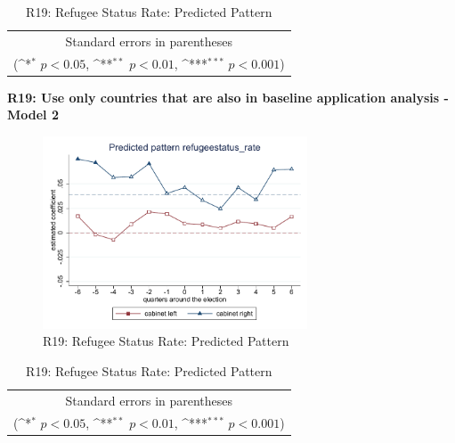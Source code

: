 \documentclass[10pt,a4paper]{scrartcl}
\begin{document}
\begin{table}[!ht]\centering
	\renewcommand{\arraystretch}{1.25}
	\def\sym#1{\ifmmode^{#1}\else\(^{#1}\)\fi}
	\caption{R19: Refugee Status Rate: Predicted Pattern}
	\begin{tabular}{l*{2}{c}}
		\hline\hline
		
		\hline\hline
		\multicolumn{3}{c}{\footnotesize Standard errors in parentheses} \\
		\multicolumn{3}{c}{\footnotesize (\sym{*} \(p<0.05\), \sym{**} \(p<0.01\), \sym{***} \(p<0.001\))}\\
	\end{tabular}
\end{table}

\clearpage
\textbf{R19: Use only countries that are also in baseline application analysis - Model 2}
\begin{figure}[!ht]
	\centering
	\includegraphics[width=0.7\textwidth]{figures_edited/refugeestatus_rate_graph2_R19.pdf}
	\caption{R19: Refugee Status Rate: Predicted Pattern}
\end{figure}

\begin{table}[!ht]\centering
	\footnotesize
	\renewcommand{\arraystretch}{1.2}
	\def\sym#1{\ifmmode^{#1}\else\(^{#1}\)\fi}
	\caption{R19: Refugee Status Rate: Predicted Pattern}
	\begin{tabular}{l*{2}{c}}
		\hline\hline
		
		\hline\hline
		\multicolumn{3}{c}{\footnotesize Standard errors in parentheses} \\
		\multicolumn{3}{c}{\footnotesize (\sym{*} \(p<0.05\), \sym{**} \(p<0.01\), \sym{***} \(p<0.001\))} \\
	\end{tabular}
\end{table}
\end{document}
